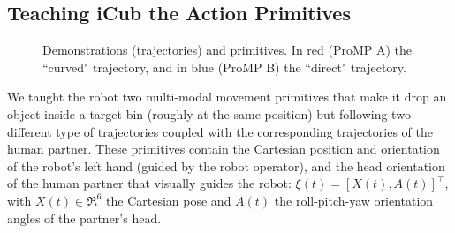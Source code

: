 \documentclass[runningheads,a4paper]{llncs}
\begin{document}
\subsection{Teaching iCub the Action Primitives}
\begin{figure}
  \centering
  \caption{Demonstrations (trajectories) and primitives. In red (ProMP A) the ``curved" trajectory, and in blue (ProMP B) the ``direct" trajectory.}
  \label{fig:distrib}
\end{figure}

We taught the robot two multi-modal movement primitives that make it drop an object inside a target bin (roughly at the same position) but following two different type of trajectories coupled with the corresponding trajectories of the human partner. 
These primitives contain the Cartesian position and orientation
of the robot's left hand (guided by the robot operator), and the head orientation of the human partner that visually guides the robot:  $\xi(t) = [X(t), A(t)]^\top$, with $X(t) \in \Re^6$ the Cartesian pose
and $A(t)$ the roll-pitch-yaw orientation angles of the partner's head. 
\end{document}

